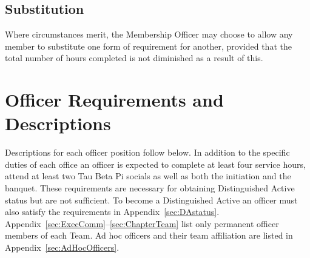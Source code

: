 \section{Substitution} Where circumstances merit, the Membership Officer may choose to allow any member to substitute one form of requirement for another, provided that the total number of hours completed is not diminished as a result of this.

\chapter{Officer Requirements and Descriptions}\label{sec:officerreq}
Descriptions for each officer position follow below. In addition to the specific duties of each office an officer is expected to complete at least four service hours, attend at least two Tau Beta Pi socials as well as both the initiation and the banquet.  These requirements are necessary for obtaining Distinguished Active status but are not sufficient.  To become a Distinguished Active an officer must also satisfy the requirements in Appendix~\ref{sec:DAstatus}. Appendix~\ref{sec:ExecComm}--\ref{sec:ChapterTeam} list only permanent officer members of each Team. Ad hoc officers and their team affiliation are listed in Appendix~\ref{sec:AdHocOfficers}.

